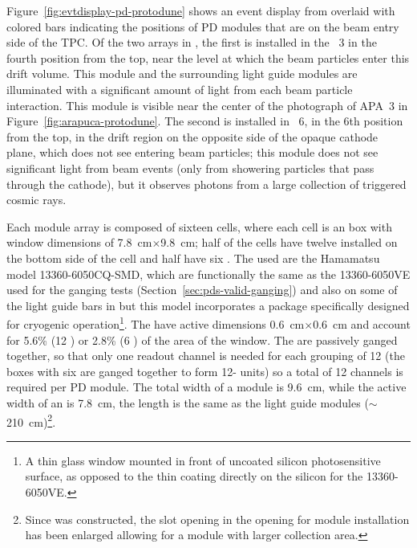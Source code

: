 Figure~\ref{fig:evtdisplay-pd-protodune} shows an event display from  overlaid with colored bars indicating the positions of PD modules that are on the beam entry side of the TPC.
Of the two  arrays in , the first is installed in the ~3 in the fourth position from the top, near the level at which the beam particles enter this drift volume. This module and the surrounding light guide modules are illuminated with a significant amount of light from each beam particle interaction. This module is visible near the center of the photograph of APA~3 in Figure~\ref{fig:arapuca-protodune}.
The second is installed in  ~6, in the 6th position from the top, in the drift region on the opposite side of the opaque cathode plane, which does not see entering beam particles; this module does not see significant light from beam events (only from showering particles that pass through the cathode), but it observes photons from a large collection of triggered cosmic rays.
 
Each   module array is composed of sixteen cells, where each cell is an  box with window dimensions of \SI{7.8}{cm}$\times$\SI{9.8}{cm}; half of the cells have twelve  installed on the bottom side of the cell and  half have six . 
The  used are the Hamamatsu model 13360-6050CQ-SMD, which are functionally the same as the 13360-6050VE used for the ganging tests (Section~\ref{sec:pds-valid-ganging}) and also on some of the light guide bars in  but this model incorporates a package specifically designed for cryogenic operation\footnote{A thin glass window mounted in front of uncoated silicon photosensitive surface, as opposed to the thin coating directly on the silicon for the 13360-6050VE.}. 
The  have active dimensions \SI{0.6}{cm}$\times$\SI{0.6}{cm} and account for 5.6\% (\num{12} ) or \num{2.8}\% (\num{6} ) of the area of the window.
The   are passively ganged together, so that only one readout channel is needed for each  grouping of \num{12}  (the boxes with six  are ganged together to form \num{12}- units) so a total of \num{12} channels is required per PD module. 
The total width of a module is \SI{9.6}{cm}, while the active width of an  is \SI{7.8}{cm}, the length is the same as the light guide modules ($\sim$\SI{210}{cm})\footnote{Since  was constructed, the slot opening in the  opening for  module installation has been enlarged allowing for a module with larger collection area.}.

